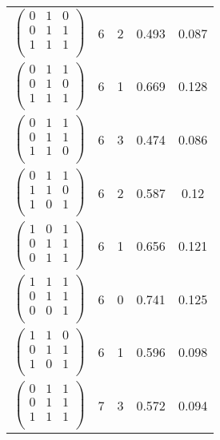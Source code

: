 \begin{longtable}{ c || c | c | c | c }
$\begin{pmatrix}
0 & 1 & 0\\
0 & 1 & 1\\
1 & 1 & 1\\
\end{pmatrix}$ & 6 & 2 & 0.493 & 0.087\\
$\begin{pmatrix}
0 & 1 & 1\\
0 & 1 & 0\\
1 & 1 & 1\\
\end{pmatrix}$ & 6 & 1 & 0.669 & 0.128\\
$\begin{pmatrix}
0 & 1 & 1\\
0 & 1 & 1\\
1 & 1 & 0\\
\end{pmatrix}$ & 6 & 3 & 0.474 & 0.086\\
$\begin{pmatrix}
0 & 1 & 1\\
1 & 1 & 0\\
1 & 0 & 1\\
\end{pmatrix}$ & 6 & 2 & 0.587 & 0.12\\
$\begin{pmatrix}
1 & 0 & 1\\
0 & 1 & 1\\
0 & 1 & 1\\
\end{pmatrix}$ & 6 & 1 & 0.656 & 0.121\\
$\begin{pmatrix}
1 & 1 & 1\\
0 & 1 & 1\\
0 & 0 & 1\\
\end{pmatrix}$ & 6 & 0 & 0.741 & 0.125\\
$\begin{pmatrix}
1 & 1 & 0\\
0 & 1 & 1\\
1 & 0 & 1\\
\end{pmatrix}$ & 6 & 1 & 0.596 & 0.098\\
$\begin{pmatrix}
0 & 1 & 1\\
0 & 1 & 1\\
1 & 1 & 1\\
\end{pmatrix}$ & 7 & 3 & 0.572 & 0.094\\

\end{longtable}

